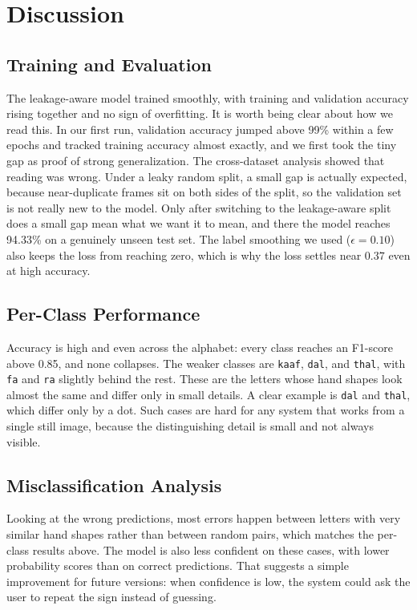\section{Discussion}

\subsection{Training and Evaluation}
The leakage-aware model trained smoothly, with training and validation accuracy
rising together and no sign of overfitting. It is worth being clear about how we
read this. In our first run, validation accuracy jumped above 99\% within a few
epochs and tracked training accuracy almost exactly, and we first took the tiny gap
as proof of strong generalization. The cross-dataset analysis showed that reading
was wrong. Under a leaky random split, a small gap is actually expected, because
near-duplicate frames sit on both sides of the split, so the validation set is not
really new to the model. Only after switching to the leakage-aware split does a
small gap mean what we want it to mean, and there the model reaches 94.33\% on a
genuinely unseen test set. The label smoothing we used ($\epsilon = 0.10$) also
keeps the loss from reaching zero, which is why the loss settles near $0.37$ even at
high accuracy.

\subsection{Per-Class Performance}
Accuracy is high and even across the alphabet: every class reaches an F1-score above
0.85, and none collapses. The weaker classes are \texttt{kaaf}, \texttt{dal}, and
\texttt{thal}, with \texttt{fa} and \texttt{ra} slightly behind the rest. These are
the letters whose hand shapes look almost the same and differ only in small details.
A clear example is \texttt{dal} and \texttt{thal}, which differ only by a dot. Such
cases are hard for any system that works from a single still image, because the
distinguishing detail is small and not always visible.

\subsection{Misclassification Analysis}
Looking at the wrong predictions, most errors happen between letters with very
similar hand shapes rather than between random pairs, which matches the per-class
results above. The model is also less confident on these cases, with lower
probability scores than on correct predictions. That suggests a simple improvement
for future versions: when confidence is low, the system could ask the user to repeat
the sign instead of guessing.

